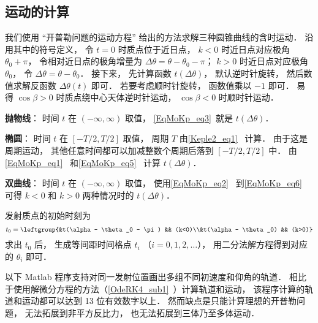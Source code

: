 \subsection{运动的计算}


我们使用 “开普勒问题的运动方程” 给出的方法求解三种圆锥曲线的含时运动． 沿用其中的符号定义， 令 $t=0$ 时质点位于近日点，  $k<0$ 时近日点对应极角 $\theta_0 + \pi$， 令相对近日点的极角增量为 $\Delta\theta = \theta - \theta_0 - \pi$； $k>0$ 时近日点对应极角 $\theta_0$， 令 $\Delta\theta = \theta - \theta_0$． 接下来， 先计算函数 $t(\Delta\theta)$， 默认逆时针旋转， 然后数值求解反函数 $\Delta\theta(t)$ 即可． 若要考虑顺时针旋转， 函数值乘以 $-1$ 即可． 易得 $\cos\beta > 0$ 时质点绕中心天体逆时针运动， $\cos\beta < 0$ 时顺时针运动．

\textbf{抛物线}： 时间 $t$ 在 $(-\infty,\infty)$ 取值， \autoref{EqMoKp_eq3}~就是 $t(\Delta\theta)$．

\textbf{椭圆}： 时间 $t$ 在 $[-T/2,T/2]$ 取值， 周期 $T$ 由\autoref{Keple2_eq1}~ 计算． 由于这是周期运动， 其他任意时间都可以加减整数个周期后落到 $[-T/2,T/2]$ 中． 由\autoref{EqMoKp_eq1}~ 和\autoref{EqMoKp_eq5}~ 计算 $t(\Delta\theta)$．

\textbf{双曲线}： 时间 $t$ 在 $(-\infty,\infty)$ 取值， 使用\autoref{EqMoKp_eq2}~ 到\autoref{EqMoKp_eq6}~ 可得 $k<0$ 和 $k>0$ 两种情况时的 $t(\Delta\theta)$．

发射质点的初始时刻为
\begin{equation}
t_0 = \leftgroup{&t(\alpha - \theta_0 - \pi) && (k<0)\\&t(\alpha - \theta_0) && (k>0)}
\end{equation}
求出 $t_0$ 后， 生成等间距时间格点 $t_i$ （$i=0,1,2,\dots$）， 用二分法解方程得到对应的 $\theta_i$ 即可．

以下 Matlab 程序支持对同一发射位置画出多组不同初速度和仰角的轨道． 相比于使用解微分方程的方法（\autoref{OdeRK4_sub1}~）计算轨道和运动， 该程序计算的轨道和运动都可以达到 13 位有效数字以上． 然而缺点是只能计算理想的开普勒问题， 无法拓展到非平方反比力， 也无法拓展到三体乃至多体运动．

